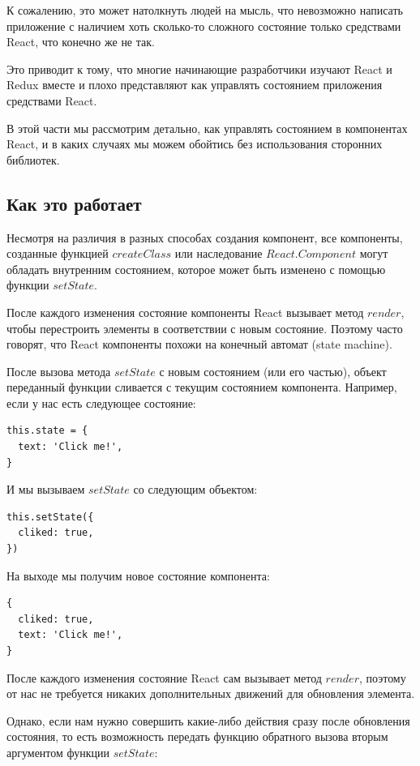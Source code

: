 К сожалению, это может натолкнуть людей на мысль, что невозможно написать приложение с наличием хоть сколько-то сложного состояние только средствами React, что конечно же не так.

Это приводит к тому, что многие начинающие разработчики изучают React и Redux вместе и плохо представляют как управлять состоянием приложения средствами React.

В этой части мы рассмотрим детально, как управлять состоянием в компонентах React, и в каких случаях мы можем обойтись без использования сторонних библиотек.

\subsection{Как это работает}

Несмотря на различия в разных способах создания компонент, все компоненты, созданные функцией $createClass$ или наследование $React.Component$ могут обладать внутренним состоянием, которое может быть изменено с помощью функции $setState$.

После каждого изменения состояние компоненты React вызывает метод $render$, чтобы перестроить элементы в соответствии с новым состояние. 
Поэтому часто говорят, что React компоненты похожи на конечный автомат (state machine).

После вызова метода $setState$ с новым состоянием (или его частью), объект переданный функции сливается с текущим состоянием компонента. Например, если у нас есть следующее состояние:

\begin{lstlisting}
this.state = {
  text: 'Click me!',
}
\end{lstlisting}

И мы вызываем $setState$ со следующим объектом:

\begin{lstlisting}
this.setState({
  cliked: true,
})
\end{lstlisting}

На выходе мы получим новое состояние компонента:

\begin{lstlisting}
{
  cliked: true,
  text: 'Click me!',
}
\end{lstlisting}

После каждого изменения состояние React сам вызывает метод $render$, поэтому от нас не требуется никаких дополнительных движений для обновления элемента.

Однако, если нам нужно совершить какие-либо действия сразу после обновления состояния, то есть возможность передать функцию обратного вызова вторым аргументом функции $setState$:

